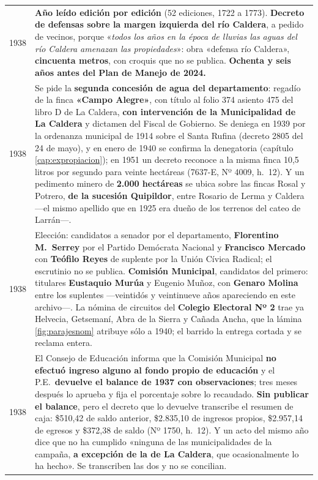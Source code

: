 \begin{longtable}{@{}p{2.7cm}p{10.3cm}@{}}
1938 & \textbf{Año leído edición por edición} (52 ediciones, 1722 a 1773). \textbf{Decreto de defensas sobre la margen izquierda del río Caldera}, a pedido de vecinos, porque «\textit{todos los años en la época de lluvias las aguas del río Caldera amenazan las propiedades}»: obra «defensa río Caldera», \textbf{cincuenta metros}, con croquis que no se publica. \textbf{Ochenta y seis años antes del Plan de Manejo de 2024.} \\
1938 & Se pide la \textbf{segunda concesión de agua del departamento}: regadío de la finca \textbf{«Campo Alegre»}, con título al folio 374 asiento 475 del libro D de La Caldera, \textbf{con intervención de la Municipalidad de La Caldera} y dictamen del Fiscal de Gobierno. Se deniega en 1939 por la ordenanza municipal de 1914 sobre el Santa Rufina (decreto 2805 del 24 de mayo), y en enero de 1940 se confirma la denegatoria (capítulo \ref{cap:expropiacion}); en 1951 un decreto reconoce a la misma finca 10,5 litros por segundo para veinte hectáreas (7637-E, Nº 4009, h.\ 12). Y un pedimento minero de \textbf{2.000 hectáreas} se ubica sobre las fincas Rosal y Potrero, \textbf{de la sucesión Quipildor}, entre Rosario de Lerma y Caldera ---el mismo apellido que en 1925 era dueño de los terrenos del cateo de Larrán---. \\
1938 & Elección: candidatos a senador por el departamento, \textbf{Florentino M.\ Serrey}\index{Serrey, Carlos} por el Partido Demócrata Nacional y \textbf{Francisco Mercado} con \textbf{Teófilo Reyes} de suplente por la Unión Cívica Radical; el escrutinio no se publica. \textbf{Comisión Municipal}, candidatos del primero: titulares \textbf{Eustaquio Murúa}\index{Murúa, Eustaquio} y Eugenio Muñoz, con \textbf{Genaro Molina} entre los suplentes ---veintidós y veintinueve años apareciendo en este archivo---. La nómina de circuitos del \textbf{Colegio Electoral Nº 2} trae ya Helvecia, Getsemaní, Abra de la Sierra y Cañada Ancha, que la lámina \ref{fig:parajesnom} atribuye sólo a 1940; el barrido la entrega cortada y se reclama entera. \\
1938 & El Consejo de Educación informa que la Comisión Municipal \textbf{no efectuó ingreso alguno al fondo propio de educación} y el P.E.\ \textbf{devuelve el balance de 1937 con observaciones}; tres meses después lo aprueba y fija el porcentaje sobre lo recaudado. \textbf{Sin publicar el balance}, pero el decreto que lo devuelve transcribe el resumen de caja: \$510,42 de saldo anterior, \$2.835,10 de ingresos propios, \$2.957,14 de egresos y \$372,38 de saldo (Nº 1750, h.\ 12). Y un acto del mismo año dice que no ha cumplido «ninguna de las municipalidades de la campaña, \textbf{a excepción de la de La Caldera}, que ocasionalmente lo ha hecho». Se transcriben las dos y no se concilian. \\

\end{longtable}
